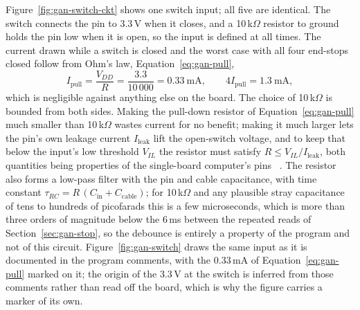 Figure~\ref{fig:gan-switch-ckt} shows one switch input; all five are identical. The switch connects the pin to 3.3\,V when it closes, and a 10\,k$\Omega$ resistor to ground holds the pin low when it is open, so the input is defined at all times.
The current drawn while a switch is closed and the worst case with all four end-stops closed follow from Ohm's law, Equation~\ref{eq:gan-pull},
\begin{equation}
I_{\mathrm{pull}}=\frac{V_{DD}}{R}=\frac{3.3}{10\,000}=0.33\ \mathrm{mA},\qquad 4I_{\mathrm{pull}}=1.3\ \mathrm{mA},
\label{eq:gan-pull}
\end{equation}
which is negligible against anything else on the board.
The choice of 10\,k$\Omega$ is bounded from both sides.
Making the pull-down resistor of Equation~\ref{eq:gan-pull} much smaller than 10\,k$\Omega$ wastes current for no benefit; making it much larger lets the pin's own leakage current $I_{\mathrm{leak}}$ lift the open-switch voltage, and to keep that below the input's low threshold $V_{IL}$ the resistor must satisfy $R\le V_{IL}/I_{\mathrm{leak}}$, both quantities being properties of the single-board computer's pins~\cite{odroidn2ds} .
The resistor also forms a low-pass filter with the pin and cable capacitance, with time constant $\tau_{RC}=R\,(C_{\mathrm{in}}+C_{\mathrm{cable}})$; for 10\,k$\Omega$ and any plausible stray capacitance of tens to hundreds of picofarads this is a few microseconds, which is more than three orders of magnitude below the 6\,ms between the repeated reads of Section~\ref{sec:gan-stop}, so the debounce is entirely a property of the program and not of this circuit.
Figure~\ref{fig:gan-switch} draws the same input as it is documented in the program comments, with the 0.33\,mA of Equation~\ref{eq:gan-pull} marked on it; the origin of the 3.3\,V at the switch is inferred from those comments rather than read off the board, which is why the figure carries a marker of its own.

